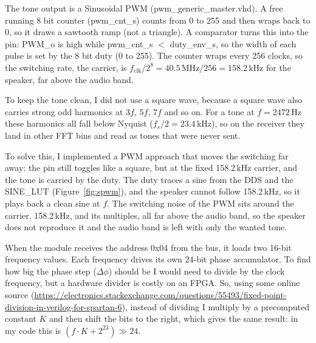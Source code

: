 \documentclass[a4paper,10pt]{article}
\begin{document}
The tone output is a Sinusoidal PWM (pwm\_generic\_master.vhd). A free running 8 bit
counter (pwm\_cnt\_s) counts from 0 to 255 and then wraps back to 0, so it draws a
sawtooth ramp (not a triangle). A comparator turns this into the pin: PWM\_o is high
while pwm\_cnt\_s $<$ duty\_env\_s, so the width of each pulse is set by the
8 bit duty (0 to 255). The counter wraps every 256 clocks, so the switching rate, the
carrier, is $f_\mathrm{clk}/2^{8} = 40.5\,\mathrm{MHz}/256 = 158.2$\,kHz for the speaker, far
above the audio band.

To keep the tone clean, I did not use a square wave, because a square wave
also carries strong odd harmonics at $3f$, $5f$, $7f$ and so on.
For a tone at $f=2472$\,Hz these harmonics all fall 
below Nyquist ($f_s/2=23.4$\,kHz), so on the receiver they land in other FFT
bins and read as tones that were never sent.

To solve this, I implemented a PWM approach that moves the switching
 far away: the pin still toggles like a square, but at the fixed 158.2\,kHz 
 carrier, and the tone is carried by the duty.
  The duty traces a sine from the DDS and the SINE\_LUT 
  (Figure~\ref{fig:spwm}), and the speaker cannot follow 158.2\,kHz, so it plays back a
  clean sine at $f$. The switching noise of the PWM sits around the carrier, 158.2\,kHz, and
  its multiples, all far above the audio band, so the speaker does not reproduce it and the
  audio band is left with only the wanted tone.



When the module receives the address 0x04 from the bus, it loads two 16-bit
 frequency values. Each frequency drives its own 24-bit phase accumulator. To find how big
 the phase step ($\Delta\phi$) should be I would need to divide by the clock frequency, but
 a hardware divider is costly on an FPGA. So, using some online source
 (\url{https://electronics.stackexchange.com/questions/55493/fixed-point-division-in-verilog-for-spartan-6}),
 instead of dividing I multiply by a precomputed constant $K$ and then shift the bits to the
 right, which gives the same result: in my code this is $(f\cdot K + 2^{23})\gg24$.
\end{document}
